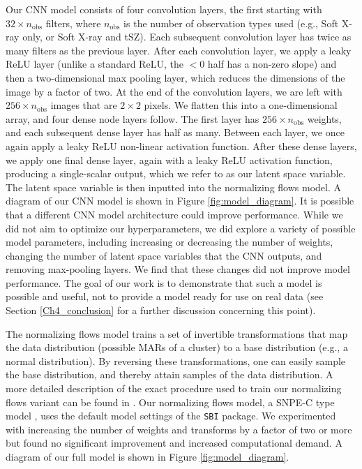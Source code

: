 Our CNN model consists of four convolution layers, the first starting with $32\times n_{\mathrm{obs}}$ filters, where $n_{\mathrm{obs}}$ is the number of observation types used (e.g., Soft X-ray only, or Soft X-ray and tSZ). Each subsequent convolution layer has twice as many filters as the previous layer. After each convolution layer, we apply a leaky ReLU layer \cite{LeakyReLU_2015} (unlike a standard ReLU, the $<0$ half has a non-zero slope) and then a two-dimensional max pooling layer, which reduces the dimensions of the image by a factor of two. At the end of the convolution layers, we are left with $256\times n_{\mathrm{obs}}$ images that are $2\times2$ pixels. We flatten this into a one-dimensional array, and four dense node layers follow. The first layer has $256\times n_{\mathrm{obs}}$ weights, and each subsequent dense layer has half as many. Between each layer, we once again apply a leaky ReLU non-linear activation function. After these dense layers, we apply one final dense layer, again with a leaky ReLU activation function, producing a single-scalar output, which we refer to as our latent space variable. The latent space variable is then inputted into the normalizing flows model. A diagram of our CNN model is shown in Figure \ref{fig:model_diagram}. It is possible that a different CNN model architecture could improve performance. While we did not aim to optimize our hyperparameters, we did explore a variety of possible model parameters, including increasing or decreasing the number of weights, changing the number of latent space variables that the CNN outputs, and removing max-pooling layers. We find that these changes did not improve model performance. The goal of our work is to demonstrate that such a model is possible and useful, not to provide a model ready for use on real data (see Section \ref{Ch4_conclusion} for a further discussion concerning this point). 

The normalizing flows model trains a set of invertible transformations that map the data distribution (possible MARs of a cluster) to a base distribution (e.g., a normal distribution). By reversing these transformations, one can easily sample the base distribution, and thereby attain samples of the data distribution. A more detailed description of the exact procedure used to train our normalizing flows variant can be found in \cite{Greenberg_2019}. Our normalizing flows model, a SNPE-C type model \cite[][see also the \texttt{SBI} documentation]{Papamakarios_2018, Greenberg_2019}, uses the default model settings of the \texttt{SBI} package. We experimented with increasing the number of weights and transforms by a factor of two or more but found no significant improvement and increased computational demand. A diagram of our full model is shown in Figure \ref{fig:model_diagram}. 

